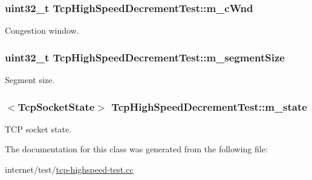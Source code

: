 \subsubsection[{\texorpdfstring{m\+\_\+c\+Wnd}{m_cWnd}}]{\setlength{\rightskip}{0pt plus 5cm}uint32\+\_\+t Tcp\+High\+Speed\+Decrement\+Test\+::m\+\_\+c\+Wnd\hspace{0.3cm}{\ttfamily [private]}}\hypertarget{classTcpHighSpeedDecrementTest_aaf98ad76a6392e76f446aa8457dc501c}{}\label{classTcpHighSpeedDecrementTest_aaf98ad76a6392e76f446aa8457dc501c}


Congestion window. 

\subsubsection[{\texorpdfstring{m\+\_\+segment\+Size}{m_segmentSize}}]{\setlength{\rightskip}{0pt plus 5cm}uint32\+\_\+t Tcp\+High\+Speed\+Decrement\+Test\+::m\+\_\+segment\+Size\hspace{0.3cm}{\ttfamily [private]}}\hypertarget{classTcpHighSpeedDecrementTest_a433f5dc10ea2d739a6f628ee0bda1582}{}\label{classTcpHighSpeedDecrementTest_a433f5dc10ea2d739a6f628ee0bda1582}


Segment size. 

\subsubsection[{\texorpdfstring{m\+\_\+state}{m_state}}]{$<${\bf Tcp\+Socket\+State}$>$ Tcp\+High\+Speed\+Decrement\+Test\+::m\+\_\+state\hspace{0.3cm}{\ttfamily [private]}}\hypertarget{classTcpHighSpeedDecrementTest_ae055a8587feb7f7ae03383e7eb6938da}{}\label{classTcpHighSpeedDecrementTest_ae055a8587feb7f7ae03383e7eb6938da}


T\+CP socket state. 



The documentation for this class was generated from the following file\+:\begin{DoxyCompactItemize}
\item 
internet/test/\hyperlink{tcp-highspeed-test_8cc}{tcp-\/highspeed-\/test.\+cc}\end{DoxyCompactItemize}
